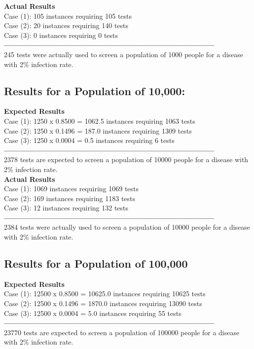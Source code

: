 \documentclass[letterpaper, 10pt,DIV=13]{scrartcl}
\numberwithin{equation}{section} %
\numberwithin{figure}{section} %
\numberwithin{table}{section} %
\begin{document}
\textbf{Actual Results} \\ 
Case (1): 105 instances requiring 105 tests \\ 
Case (2): 20 instances requiring 140 tests \\ 
Case (3): 0 instances requiring 0 tests \\ 
\textbf{\---------------------------------------------------------------------------------} \\ 
245 tests were actually used to screen a population of 1000 people for a disease with 2\% infection rate.

\subsection{Results for a Population of 10,000:}
\lstset{numbers=left, numberstyle=\tiny, stepnumber=1, numbersep=5pt, basicstyle=\footnotesize\ttfamily}
\textbf{Expected Results} \\
Case (1): 1250 x 0.8500 = 1062.5 instances requiring 1063 tests \\
Case (2): 1250 x 0.1496 = 187.0 instances requiring 1309 tests \\
Case (3): 1250 x 0.0004 = 0.5 instances requiring 6 tests \\     
\textbf{\---------------------------------------------------------------------------------} \\ 
2378 tests are expected to screen a population of 10000 people for a disease with 2\% infection rate. \\

\textbf{Actual Results} \\
Case (1): 1069 instances requiring 1069 tests \\
Case (2): 169 instances requiring 1183 tests \\
Case (3): 12 instances requiring 132 tests \\
\textbf{\---------------------------------------------------------------------------------} \\ 
2384 tests were actually used to screen a population of 10000 people for a disease with 2\% infection rate.

\subsection{Results for a Population of 100,000}
\lstset{numbers=left, numberstyle=\tiny, stepnumber=1, numbersep=5pt, basicstyle=\footnotesize\ttfamily}
\textbf{Expected Results} \\
Case (1): 12500 x 0.8500 = 10625.0 instances requiring 10625 tests \\
Case (2): 12500 x 0.1496 = 1870.0 instances requiring 13090 tests \\
Case (3): 12500 x 0.0004 = 5.0 instances requiring 55 tests \\
\textbf{\---------------------------------------------------------------------------------} \\ 
23770 tests are expected to screen a population of 100000 people for a disease with 2\% infection rate. \\
\end{document}
